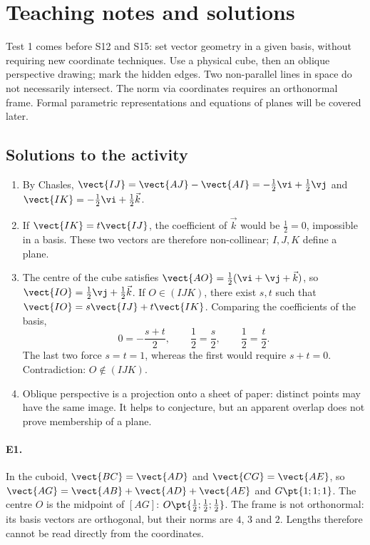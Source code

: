 \ifmxteacher\mxnewpage\section{Teaching notes and solutions}\begin{teachernote}Test 1 comes before S12 and S15: set vector geometry in a given basis, without requiring new coordinate techniques. Use a physical cube, then an oblique perspective drawing; mark the hidden edges. Two non-parallel lines in space do not necessarily intersect. The norm via coordinates requires an orthonormal frame. Formal parametric representations and equations of planes will be covered later.\end{teachernote}

\subsection{Solutions to the activity}\begin{enumerate}
\item By Chasles, $\vect{IJ}=\vect{AJ}-\vect{AI}=-\frac12\vi +\frac12\vj $ and $\vect{IK}=-\frac12\vi +\frac12\vec k$.
\item If $\vect{IK}=t\vect{IJ}$, the coefficient of $\vec k$ would be $\frac{1}{2}=0$, impossible in a basis. These two vectors are therefore non-collinear; $I,J,K$ define a plane.
\item The centre of the cube satisfies $\vect{AO}=\frac12(\vi +\vj +\vec k)$, so $\vect{IO}=\frac12\vj +\frac12\vec k$. If $O\in(IJK)$, there exist $s,t$ such that $\vect{IO}=s\vect{IJ}+t\vect{IK}$. Comparing the coefficients of the basis,
\[0=-\frac{s+t}2,\qquad \frac12=\frac s2,\qquad \frac12=\frac t2.\]
The last two force $s=t=1$, whereas the first would require $s+t=0$. Contradiction: $O\notin(IJK)$.
\item Oblique perspective is a projection onto a sheet of paper: distinct points may have the same image. It helps to conjecture, but an apparent overlap does not prove membership of a plane.
\end{enumerate}

\paragraph{E1.}In the cuboid, $\vect{BC}=\vect{AD}$ and $\vect{CG}=\vect{AE}$, so $\vect{AG}=\vect{AB}+\vect{AD}+\vect{AE}$ and $G\pt{1;1;1}$. The centre $O$ is the midpoint of $[AG]$: $O\pt{\frac12;\frac12;\frac12}$. The frame is not orthonormal: its basis vectors are orthogonal, but their norms are $4$, $3$ and $2$. Lengths therefore cannot be read directly from the coordinates.

